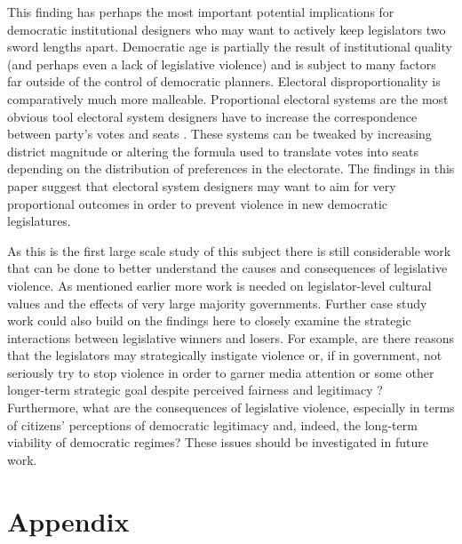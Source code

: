 \documentclass[a4paper]{article}\usepackage{graphicx, color}
\begin{document}
This finding has perhaps the most important potential implications for democratic institutional designers who may want to actively keep legislators two sword lengths apart. Democratic age is partially the result of institutional quality (and perhaps even a lack of legislative violence) and is subject to many factors far outside of the control of democratic planners. Electoral disproportionality is comparatively much more malleable. Proportional electoral systems are the most obvious tool electoral system designers have to increase the correspondence between party's votes and seats \citep{Carey2011}. These systems can be tweaked by increasing district magnitude or altering the formula used to translate votes into seats depending on the distribution of preferences in the electorate. The findings in this paper suggest that electoral system designers may want to aim for very proportional outcomes in order to prevent violence in new democratic legislatures. 

As this is the first large scale study of this subject there is still considerable work that can be done to better understand the causes and consequences of legislative violence. As mentioned earlier more work is needed on legislator-level cultural values and the effects of very large majority governments. Further case study work could also build on the findings here to closely examine the strategic interactions between legislative winners and losers. For example, are there reasons that the legislators may strategically instigate violence or, if in government, not seriously try to stop violence in order to garner media attention or some other longer-term strategic goal despite perceived fairness and legitimacy \citep[e.g.][]{Beaulieu2008}? Furthermore, what are the consequences of legislative violence, especially in terms of citizens' perceptions of democratic legitimacy and, indeed, the long-term viability of democratic regimes? These issues should be investigated in future work. 





\theendnotes


\clearpage
\section*{Appendix}
\end{document}
